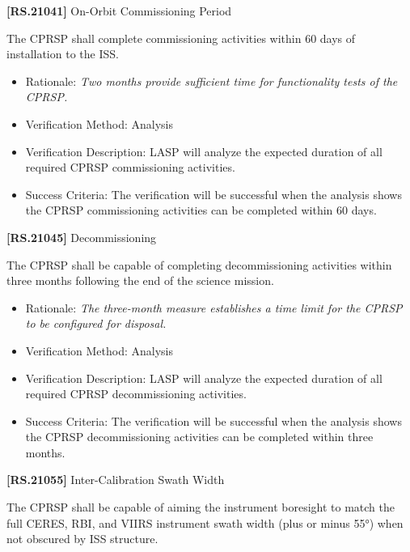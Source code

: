 \textbf{[RS.21041]} On-Orbit Commissioning Period

The \gls{CPRSP} shall complete commissioning activities within 60 days of installation to the \gls{ISS}.

\begin{itemize}
\item{} Rationale: \emph{Two months provide sufficient time for functionality tests of the CPRSP.}

\item{} Verification Method: Analysis

\item{} Verification Description: \gls{LASP} will analyze the expected duration of all required \gls{CPRSP} commissioning activities.

\item{} Success Criteria: The verification will be successful when the \gls{analysis} shows the \gls{CPRSP} commissioning activities can be completed within 60 days.

\end{itemize}

\textbf{[RS.21045]} Decommissioning

The \gls{CPRSP} shall be capable of completing decommissioning activities within three months following the end of the science mission.

\begin{itemize}
\item{} Rationale: \emph{The three-month measure establishes a time limit for the CPRSP to be configured for disposal.}

\item{} Verification Method: Analysis

\item{} Verification Description: \gls{LASP} will analyze the expected duration of all required \gls{CPRSP} decommissioning activities.

\item{} Success Criteria: The verification will be successful when the \gls{analysis} shows the \gls{CPRSP} decommissioning activities can be completed within three months.

\end{itemize}

\textbf{[RS.21055]} Inter-Calibration Swath Width

The \gls{CPRSP} shall be capable of aiming the instrument boresight to match the full \gls{CERES}, \gls{RBI}, and \gls{VIIRS} instrument swath width (plus or minus 55°) when not obscured by \gls{ISS} structure.

